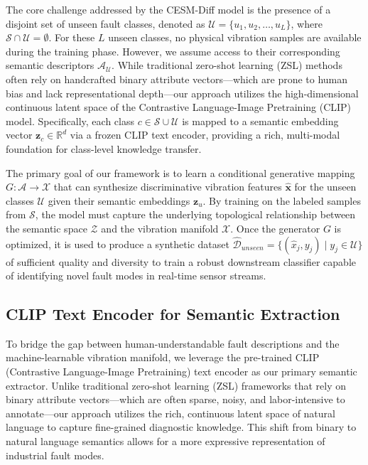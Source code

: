 \documentclass[journal]{IEEEtran}
\begin{document}
The core challenge addressed by the CESM-Diff model is the presence of a disjoint set of unseen fault classes, denoted as $\mathcal{U} = \{u_1, u_2, \dots, u_L\}$, where $\mathcal{S} \cap \mathcal{U} = \emptyset$. For these $L$ unseen classes, no physical vibration samples are available during the training phase. However, we assume access to their corresponding semantic descriptors $\mathcal{A}_{\mathcal{U}}$. While traditional zero-shot learning (ZSL) methods often rely on handcrafted binary attribute vectors—which are prone to human bias and lack representational depth—our approach utilizes the high-dimensional continuous latent space of the Contrastive Language-Image Pretraining (CLIP) model. Specifically, each class $c \in \mathcal{S} \cup \mathcal{U}$ is mapped to a semantic embedding vector $\mathbf{z}_c \in \mathbb{R}^d$ via a frozen CLIP text encoder, providing a rich, multi-modal foundation for class-level knowledge transfer.

The primary goal of our framework is to learn a conditional generative mapping $G: \mathcal{A} \to \mathcal{X}$ that can synthesize discriminative vibration features $\hat{\mathbf{x}}$ for the unseen classes $\mathcal{U}$ given their semantic embeddings $\mathbf{z}_u$. By training on the labeled samples from $\mathcal{S}$, the model must capture the underlying topological relationship between the semantic space $\mathcal{Z}$ and the vibration manifold $\mathcal{X}$. Once the generator $G$ is optimized, it is used to produce a synthetic dataset $\hat{\mathcal{D}}_{unseen} = \{(\hat{x}_j, y_j) \mid y_j \in \mathcal{U}\}$ of sufficient quality and diversity to train a robust downstream classifier capable of identifying novel fault modes in real-time sensor streams.

\subsection{CLIP Text Encoder for Semantic Extraction}
\label{sec:method_clip_text_encoder}

To bridge the gap between human-understandable fault descriptions and the machine-learnable vibration manifold, we leverage the pre-trained CLIP (Contrastive Language-Image Pretraining) text encoder as our primary semantic extractor. Unlike traditional zero-shot learning (ZSL) frameworks that rely on binary attribute vectors—which are often sparse, noisy, and labor-intensive to annotate—our approach utilizes the rich, continuous latent space of natural language to capture fine-grained diagnostic knowledge. This shift from binary to natural language semantics allows for a more expressive representation of industrial fault modes.
\end{document}

